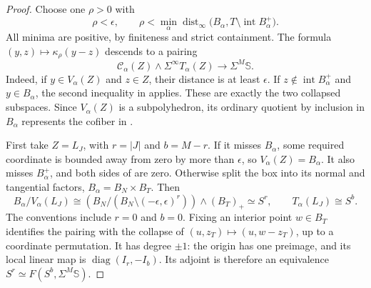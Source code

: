 \begin{proof}
Choose one $\rho>0$ with
\begin{equation}\label{eq:common-collapse-radius}
 \rho<\epsilon,\qquad
 \rho<\min_\alpha
 \operatorname{dist}_\infty
 \bigl(B_\alpha,T\setminus\operatorname{int}B_\alpha^+\bigr).
\end{equation}
All minima are positive, by finiteness and strict containment.  The
formula $(y,z)\mapsto\kappa_\rho(y-z)$ descends to a pairing
\begin{equation}\label{eq:equality-pairing}
 \mathcal C_\alpha(Z)\wedge\Sigma^\infty T_\alpha(Z)
 \longrightarrow\Sigma^M\mathbb S.
\end{equation}
Indeed, if $y\in V_\alpha(Z)$ and $z\in Z$, their distance is at least
$\epsilon$.  If $z\notin\operatorname{int}B_\alpha^+$ and
$y\in B_\alpha$, the second inequality in
 applies.  These are exactly the two
collapsed subspaces.  Since $V_\alpha(Z)$ is a subpolyhedron, its
ordinary quotient by inclusion in $B_\alpha$ represents the cofiber
in .

First take $Z=L_J$, with $r=|J|$ and $b=M-r$.  If it misses
$B_\alpha$, some required coordinate is bounded away from zero by more
than $\epsilon$, so $V_\alpha(Z)=B_\alpha$.  It also misses
$B_\alpha^+$, and both sides of  are zero.
Otherwise split the box into its normal and tangential factors,
$B_\alpha=B_N\times B_T$.  Then
\[
 B_\alpha/V_\alpha(L_J)
 \cong
 \left(B_N/(B_N\setminus(-\epsilon,\epsilon)^r)\right)
 \wedge(B_T)_+\simeq S^r,
 \qquad T_\alpha(L_J)\cong S^b.
\]
The conventions include $r=0$ and $b=0$.  Fixing an interior point
$w\in B_T$ identifies the pairing with the collapse of
$(u,z_T)\mapsto(u,w-z_T)$, up to a coordinate permutation.  It has
degree $\pm1$: the origin has one preimage, and its local linear map is
$\operatorname{diag}(I_r,-I_b)$.  Its adjoint is therefore an
equivalence $S^r\simeq F(S^b,\Sigma^M\mathbb S)$.


\end{proof}
